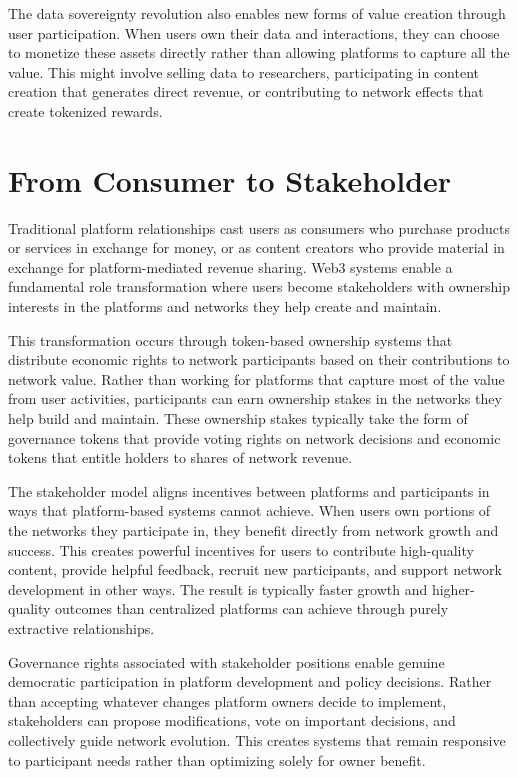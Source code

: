 \documentclass[
  Letterpaper,
]{scrbook}
\begin{document}
The data sovereignty revolution also enables new forms of value creation
through user participation. When users own their data and interactions,
they can choose to monetize these assets directly rather than allowing
platforms to capture all the value. This might involve selling data to
researchers, participating in content creation that generates direct
revenue, or contributing to network effects that create tokenized
rewards.

\section{From Consumer to
Stakeholder}\label{from-consumer-to-stakeholder}

Traditional platform relationships cast users as consumers who purchase
products or services in exchange for money, or as content creators who
provide material in exchange for platform-mediated revenue sharing. Web3
systems enable a fundamental role transformation where users become
stakeholders with ownership interests in the platforms and networks they
help create and maintain.

This transformation occurs through token-based ownership systems that
distribute economic rights to network participants based on their
contributions to network value. Rather than working for platforms that
capture most of the value from user activities, participants can earn
ownership stakes in the networks they help build and maintain. These
ownership stakes typically take the form of governance tokens that
provide voting rights on network decisions and economic tokens that
entitle holders to shares of network revenue.

The stakeholder model aligns incentives between platforms and
participants in ways that platform-based systems cannot achieve. When
users own portions of the networks they participate in, they benefit
directly from network growth and success. This creates powerful
incentives for users to contribute high-quality content, provide helpful
feedback, recruit new participants, and support network development in
other ways. The result is typically faster growth and higher-quality
outcomes than centralized platforms can achieve through purely
extractive relationships.

Governance rights associated with stakeholder positions enable genuine
democratic participation in platform development and policy decisions.
Rather than accepting whatever changes platform owners decide to
implement, stakeholders can propose modifications, vote on important
decisions, and collectively guide network evolution. This creates
systems that remain responsive to participant needs rather than
optimizing solely for owner benefit.
\end{document}
